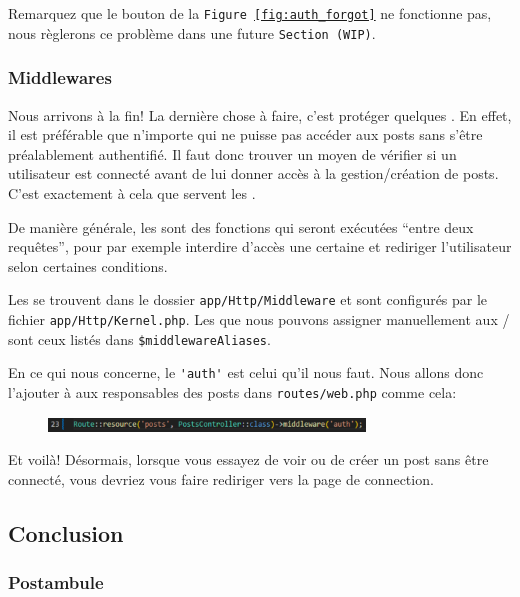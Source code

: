 \documentclass[internal]{nhitec_design}
\begin{document}
\newpage

Remarquez que le bouton de la \texttt{Figure~\ref{fig:auth_forgot}} ne fonctionne pas, nous règlerons ce problème dans une future \texttt{Section~(WIP)}.

\subsubsection[Middlewares][laravel.com/docs/10.x/middleware]{Middlewares}

Nous arrivons à la fin! La dernière chose à faire, c'est protéger quelques \routes. En effet, il est préférable que n'importe qui ne puisse pas accéder aux posts sans s'être préalablement authentifié. Il faut donc trouver un moyen de vérifier si un utilisateur est connecté avant de lui donner accès à la gestion/création de posts. C'est exactement à cela que servent les \middlewares{}.

De manière générale, les \middlewares{} sont des fonctions qui seront exécutées ``entre deux requêtes'', pour par exemple interdire d'accès une certaine \route{} et rediriger l'utilisateur selon certaines conditions.

Les \middlewares{} se trouvent dans le dossier \verb|app/Http/Middleware| et sont configurés par le fichier \verb|app/Http/Kernel.php|. Les \middlewares{} que nous pouvons assigner manuellement aux \routes{}/\controllers{} sont ceux listés dans \verb|$middlewareAliases|.

En ce qui nous concerne, le \middleware{} \verb|'auth'| est celui qu'il nous faut. Nous allons donc l'ajouter à aux \routes{} responsables des posts dans \verb|routes/web.php| comme cela:

\begin{figure}[!h]
    \centering
    \includegraphics[width=0.75\textwidth]{figures-C1/middleware_auth.pdf}
\end{figure}

Et voilà! Désormais, lorsque vous essayez de voir ou de créer un post sans être connecté, vous devriez vous faire rediriger vers la page de connection.

\newpage

\subsection{Conclusion}

\subsubsection{Postambule}
\end{document}
